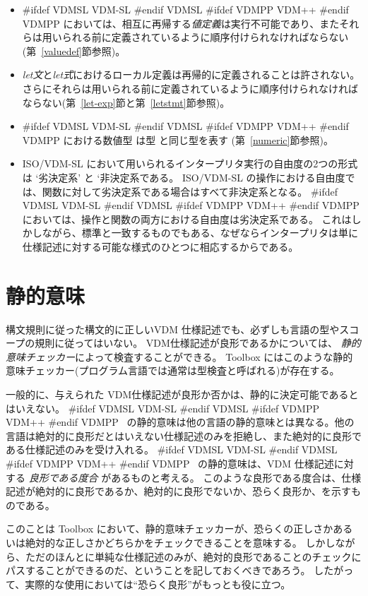 \documentclass[\pformat,12pt]{jarticle}
\newcommand{\vdmslpp}[2]{%
#ifdef VDMSL
#1
#endif VDMSL
#ifdef VDMPP
#2
#endif VDMPP
}
\newcommand{\vdmsl}{VDM-SL}
\newcommand{\vdmpp}{VDM++}
\begin{document}
\begin{description}
\begin{itemize}
  \item  \vdmslpp{\vdmsl}{\vdmpp}においては、相互に再帰する{\it 値定義\/}は実行不可能であり、またそれらは用いられる前に定義されているように順序付けられなければならない (第~\ref{valuedef}節参照)。
    
  \item  {\it let文\/}と{\it  let式\/}におけるローカル定義は再帰的に定義されることは許されない。
さらにそれらは用いられる前に定義されているように順序付けられなければならない(第~\ref{let-exp}節と第~\ref{letstmt}節参照)。 
    
  \item \vdmslpp{\vdmsl}{\vdmpp}における数値型  は型 と同じ型を表す (第~\ref{numeric}節参照)。   
      
  \item   ISO/VDM-SL において用いられるインタープリタ実行の自由度の2つの形式 は `劣決定系' と `非決定系である。 
 ISO/VDM-SL の操作における自由度では、関数に対して劣決定系である場合はすべて非決定系となる。
 \vdmslpp{\vdmsl}{\vdmpp}においては、操作と関数の両方における自由度は劣決定系である。
これはしかしながら、標準と一致するものでもある、なぜならインタープリタは単に仕様記述に対する可能な様式のひとつに相応するからである。

  \end{itemize}
\end{description}

\section{静的意味}\label{static}

構文規則に従った構文的に正しいVDM 仕様記述でも、必ずしも言語の型やスコープの規則に従ってはいない。
VDM仕様記述が良形であるかについては、 {\em 静的意味チェッカー}によって検査することができる。
Toolbox にはこのような静的意味チェッカー(プログラム言語では通常は型検査と呼ばれる)が存在する。

一般的に、与えられた VDM仕様記述が良形か否かは、静的に決定可能であるとはいえない。
\vdmslpp{\vdmsl}{\vdmpp}\ の静的意味は他の言語の静的意味とは異なる。他の言語は絶対的に良形だとはいえない仕様記述のみを拒絶し、また絶対的に良形で
ある仕様記述のみを受け入れる。 
\vdmslpp{\vdmsl}{\vdmpp}\ の静的意味は、VDM 仕様記述に対する {\em 良形である度合} があるものと考える。
このような良形である度合は、仕様記述が絶対的に良形であるか、絶対的に良形でないか、恐らく良形か、を示すものである。

このことは Toolbox において、静的意味チェッカーが、恐らくの正しさかあるいは絶対的な正しさかどちらかをチェックできることを意味する。
しかしながら、ただのほんとに単純な仕様記述のみが、絶対的良形であることのチェックにパスすることができるのだ、ということを記しておくべきであろう。
したがって、実際的な使用においては``恐らく良形''がもっとも役に立つ。
\end{document}
